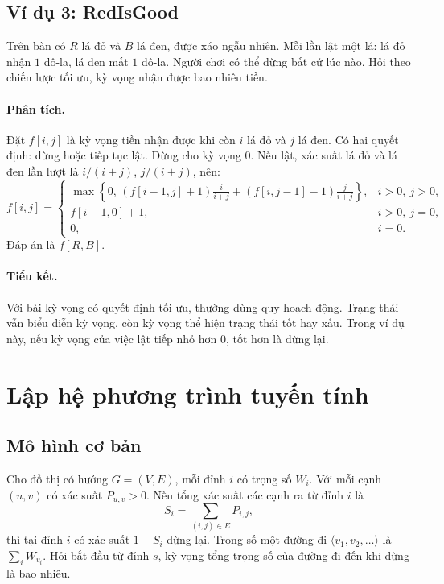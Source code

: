 \documentclass[11pt]{article}
\begin{document}
\subsection{Ví dụ 3: RedIsGood}

Trên bàn có \(R\) lá đỏ và \(B\) lá đen, được xáo ngẫu nhiên. Mỗi lần lật một
lá: lá đỏ nhận \(1\) đô-la, lá đen mất \(1\) đô-la. Người chơi có thể dừng bất
cứ lúc nào. Hỏi theo chiến lược tối ưu, kỳ vọng nhận được bao nhiêu tiền.

\paragraph{Phân tích.}
Đặt \(f[i,j]\) là kỳ vọng tiền nhận được khi còn \(i\) lá đỏ và \(j\) lá đen.
Có hai quyết định: dừng hoặc tiếp tục lật. Dừng cho kỳ vọng \(0\). Nếu lật,
xác suất lá đỏ và lá đen lần lượt là \(i/(i+j)\), \(j/(i+j)\), nên:
\[
f[i,j]=
\begin{cases}
\max\left\{0,\,
(f[i-1,j]+1)\frac{i}{i+j}
+(f[i,j-1]-1)\frac{j}{i+j}\right\},
  & i>0,\ j>0,\\[0.6em]
f[i-1,0]+1, & i>0,\ j=0,\\
0, & i=0.
\end{cases}
\]
Đáp án là \(f[R,B]\).

\paragraph{Tiểu kết.}
Với bài kỳ vọng có quyết định tối ưu, thường dùng quy hoạch động. Trạng thái
vẫn biểu diễn kỳ vọng, còn kỳ vọng thể hiện trạng thái tốt hay xấu. Trong ví
dụ này, nếu kỳ vọng của việc lật tiếp nhỏ hơn \(0\), tốt hơn là dừng lại.

\section{Lập hệ phương trình tuyến tính}

\subsection{Mô hình cơ bản}

Cho đồ thị có hướng \(G=(V,E)\), mỗi đỉnh \(i\) có trọng số \(W_i\). Với mỗi
cạnh \((u,v)\) có xác suất \(P_{u,v}>0\). Nếu tổng xác suất các cạnh ra từ
đỉnh \(i\) là
\[
  S_i=\sum_{(i,j)\in E} P_{i,j},
\]
thì tại đỉnh \(i\) có xác suất \(1-S_i\) dừng lại. Trọng số một đường đi
\(\langle v_1,v_2,\ldots\rangle\) là \(\sum_i W_{v_i}\). Hỏi bắt đầu từ đỉnh
\(s\), kỳ vọng tổng trọng số của đường đi đến khi dừng là bao nhiêu.
\end{document}
